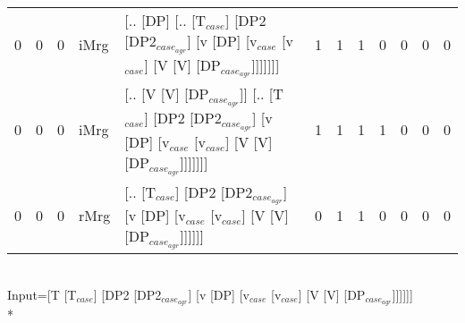 \begin{tabularx}{\linewidth}{rrrlXrrrrrrr}
   0 &       0 &   0 & iMrg & [.. [DP] [.. [T$_{case}$] [DP2 [DP2$_{case_{agr}}$] [v [DP] [v$_{case}$ [v$_{case}$] [V [V] [DP$_{case_{agr}}$]]]]]]]                                                                  &            1 &             1 &             1 &                  0 &              0 &              0 &            0 \\
   0 &       0 &   0 & iMrg & [.. [V [V] [DP$_{case_{agr}}$]] [.. [T$_{case}$] [DP2 [DP2$_{case_{agr}}$] [v [DP] [v$_{case}$ [v$_{case}$] [V [V] [DP$_{case_{agr}}$]]]]]]]                                                 &            1 &             1 &             1 &                  1 &              0 &              0 &            0 \\
   0 &       0 &   0 & rMrg & [.. [T$_{case}$] [DP2 [DP2$_{case_{agr}}$] [v [DP] [v$_{case}$ [v$_{case}$] [V [V] [DP$_{case_{agr}}$]]]]]]                                                                            &            0 &             1 &             1 &                  0 &              0 &              0 &            0 \\
\hline
\end{tabularx}\endgroup\\
\begingroup\scriptsize Input=[T [T$_{case}$] [DP2 [DP2$_{case_{agr}}$] [v [DP] [v$_{case}$ [v$_{case}$] [V [V] [DP$_{case_{agr}}$]]]]]]\\*

